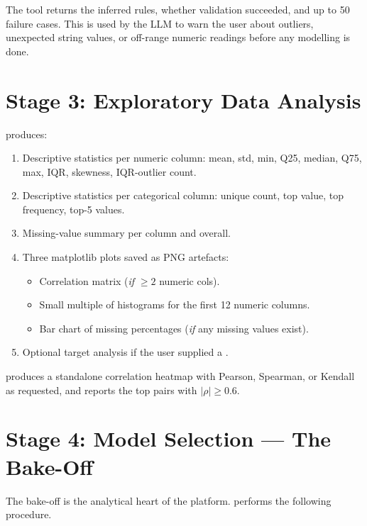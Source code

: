 The tool returns the inferred rules, whether validation succeeded,
and up to 50 failure cases. This is used by the LLM to warn the user
about outliers, unexpected string values, or off-range numeric
readings before any modelling is done.

\section{Stage 3: Exploratory Data Analysis}
\label{sec:stage-eda}

 produces:

\begin{enumerate}[leftmargin=1.4em]
  \item Descriptive statistics per numeric column: mean, std, min,
        Q25, median, Q75, max, IQR, skewness, IQR-outlier count.
  \item Descriptive statistics per categorical column: unique count,
        top value, top frequency, top-5 values.
  \item Missing-value summary per column and overall.
  \item Three matplotlib plots saved as PNG artefacts:
        \begin{itemize}[leftmargin=1.2em]
          \item Correlation matrix (\emph{if} $\ge 2$ numeric cols).
          \item Small multiple of histograms for the first
                12 numeric columns.
          \item Bar chart of missing percentages (\emph{if} any
                missing values exist).
        \end{itemize}
  \item Optional target analysis if the user supplied a
        .
\end{enumerate}

 produces a standalone correlation
heatmap with Pearson, Spearman, or Kendall as requested, and reports
the top pairs with $|\rho| \ge 0.6$.

\section{Stage 4: Model Selection --- The Bake-Off}
\label{sec:stage-bakeoff}

The bake-off is the analytical heart of the platform.
 performs the following procedure.

